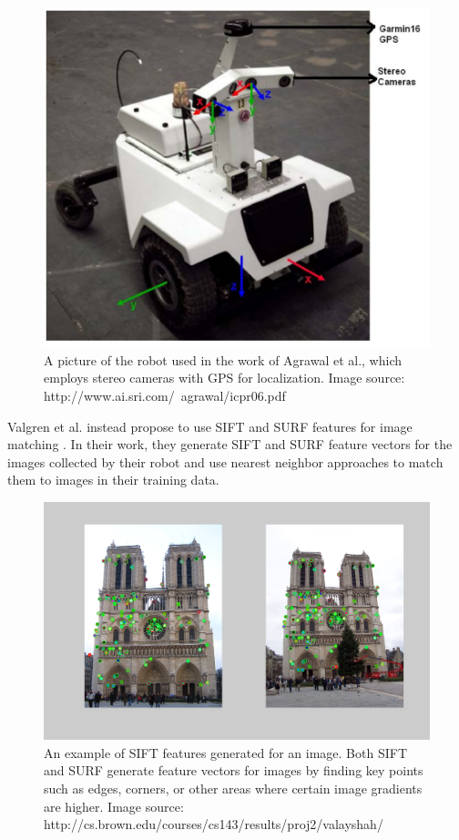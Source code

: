 \documentclass[letterpaper, 12 pt, conference]{ieeeconf}  %
\begin{document}
\begin{figure}[h]
\centering
\includegraphics[scale=1.0]{Stereo}
\caption{A picture of the robot used in the work of Agrawal et al., which employs stereo cameras with GPS for localization. Image source: http://www.ai.sri.com/~agrawal/icpr06.pdf}
\end{figure}
\par
Valgren et al. instead propose to use SIFT and SURF features for image matching \cite{valgren2007sift}. In their work, they generate SIFT \cite{sift} and SURF\cite{surf} feature vectors for the images collected by their robot and use nearest neighbor approaches to match them to images in their training data. 

\begin{figure}[h]
\centering
\includegraphics[scale=0.3]{sift}
\caption{An example of SIFT features generated for an image. Both SIFT and SURF generate feature vectors for images by finding key points such as edges, corners, or other areas where certain image gradients are higher. Image source: http://cs.brown.edu/courses/cs143/results/proj2/valayshah/}
\end{figure}
\end{document}
